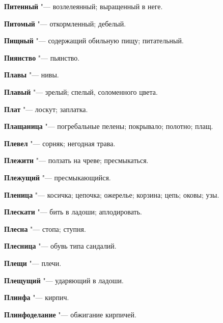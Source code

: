 \begin{mymulticols}{2}
\noindent\textbf{Питенный} "--- возлелеянный; выращенный в неге. 




\noindent\textbf{Питомый} "--- откормленный; дебелый. 




\noindent\textbf{Пищный} "--- содержащий обильную пищу; питательный. 




\noindent\textbf{Пиянство} "--- пьянство. 




\noindent\textbf{Плавы} "--- нивы. 




\noindent\textbf{Плавый} "--- зрелый; спелый, соломенного цвета. 




\noindent\textbf{Плат} "--- лоскут; заплатка. 




\noindent\textbf{Плащаница} "--- погребальные пелены; покрывало; полотно; плащ. 




\noindent\textbf{Плевел} "--- сорняк; негодная трава. 




\noindent\textbf{Плежити} "--- ползать на чреве; пресмыкаться. 




\noindent\textbf{Плежущий} "--- пресмыкающийся. 




\noindent\textbf{Пленица} "--- косичка; цепочка; ожерелье; корзина; цепь; оковы; узы. 




\noindent\textbf{Плескати} "--- бить в ладоши; аплодировать. 




\noindent\textbf{Плесна} "--- стопа; ступня. 




\noindent\textbf{Плесница} "--- обувь типа сандалий. 




\noindent\textbf{Плещи} "--- плечи. 




\noindent\textbf{Плещущий} "--- ударяющий в ладоши. 




\noindent\textbf{Плинфа} "--- кирпич. 




\noindent\textbf{Плинфоделание} "--- обжигание кирпичей. 





\end{mymulticols}
